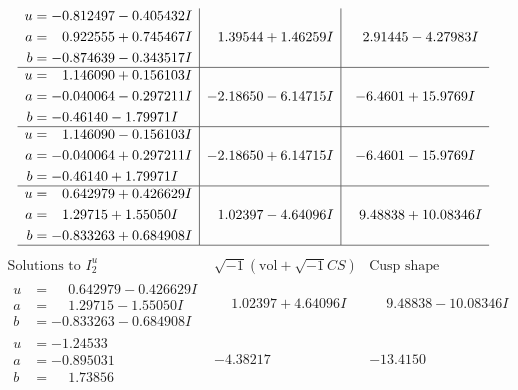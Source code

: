 \documentclass[1p]{elsarticle_modified}
\theoremstyle{definition}
\newcommand{\I}{\sqrt{-1}}
\begin{document}
$$\begin{array}{c|c|c}
\begin{aligned}
u &= -0.812497 - 0.405432 I \\
a &= \phantom{-}0.922555 + 0.745467 I \\
b &= -0.874639 - 0.343517 I\end{aligned}
 & \phantom{-}1.39544 + 1.46259 I & \phantom{-}2.91445 - 4.27983 I \\ \hline\begin{aligned}
u &= \phantom{-}1.146090 + 0.156103 I \\
a &= -0.040064 - 0.297211 I \\
b &= -0.46140 - 1.79971 I\end{aligned}
 & -2.18650 - 6.14715 I & -6.4601 + 15.9769 I \\ \hline\begin{aligned}
u &= \phantom{-}1.146090 - 0.156103 I \\
a &= -0.040064 + 0.297211 I \\
b &= -0.46140 + 1.79971 I\end{aligned}
 & -2.18650 + 6.14715 I & -6.4601 - 15.9769 I \\ \hline\begin{aligned}
u &= \phantom{-}0.642979 + 0.426629 I \\
a &= \phantom{-}1.29715 + 1.55050 I \\
b &= -0.833263 + 0.684908 I\end{aligned}
 & \phantom{-}1.02397 - 4.64096 I & \phantom{-}9.48838 + 10.08346 I\\
 \hline 
 \end{array}$$\newpage$$\begin{array}{c|c|c}  
\text{Solutions to }I^u_{2}& \I (\text{vol} + \sqrt{-1}CS) & \text{Cusp shape}\\
 \hline 
\begin{aligned}
u &= \phantom{-}0.642979 - 0.426629 I \\
a &= \phantom{-}1.29715 - 1.55050 I \\
b &= -0.833263 - 0.684908 I\end{aligned}
 & \phantom{-}1.02397 + 4.64096 I & \phantom{-}9.48838 - 10.08346 I \\ \hline\begin{aligned}
u &= -1.24533\phantom{ +0.000000I} \\
a &= -0.895031\phantom{ +0.000000I} \\
b &= \phantom{-}1.73856\phantom{ +0.000000I}\end{aligned}
 & -4.38217\phantom{ +0.000000I} & -13.4150\phantom{ +0.000000I} \\ \hline\begin{aligned}

\end{aligned}
\end{array}$$
\end{document}
